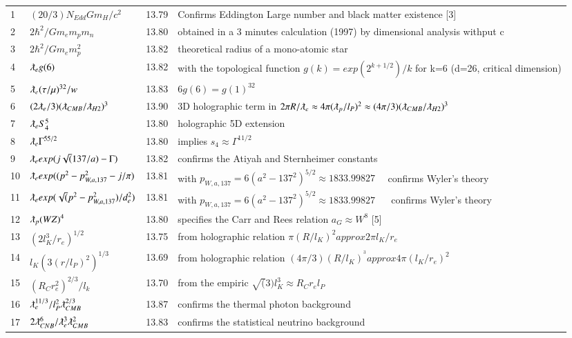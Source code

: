 \documentclass[a4paper,9pt]{article}
\begin{document}
\begin{appendix}
\begin{table}
\begin{tabular}{llll}
    
    1 & $(20/3)N_{Edd}Gm_H/c^2$ & 13.79 & Confirms Eddington Large number and black matter existence [3] \\
    2 & $2\hbar^2/Gm_em_pm_n$ & 13.80 & obtained in a 3 minutes calculation (1997) by dimensional analysis withput c\\
    3 & $2\hbar^2/Gm_em_p^2$ & 13.82 & theoretical radius of a mono-atomic star\\
    4 & $\lambdabar_{e} g(6)$ & 13.82 & with the topological function $g(k)=exp(2^{k+1/2})/k$ for k=6 (d=26, critical dimension)\\
    5 & $\lambdabar_{e} (\tau/\mu)^{32}/w$ & 13.83 & $6g(6) = g(1)^{32}$\\     
    6 & $(2\lambdabar_{e}/3)(\lambdabar_{CMB}/\lambdabar_{H2})^3$ & 13.90 & 3D holographic term in $2\pi R/\lambdabar_{e} \approx 4\pi (\lambdabar_{p}/l_P)^2 \approx (4\pi /3) (\lambdabar_{CMB}/\lambdabar_{H2})^3$ \\
    7 & $\lambdabar_{e} S_4^5$ & 13.80 & holographic 5D extension\\
    8 & $\lambdabar_{e} \Gamma^{55/2}$ & 13.80 & implies $s_4 \approx \Gamma^{11/2}$\\
    9 & $\lambdabar_{e} exp(j\sqrt (137/a) - \Gamma)$ & 13.82 &confirms the Atiyah and Sternheimer constants\\ 
    10 & $\lambdabar_{e} exp((p^2-p_{W,a,137}^2 - j/\pi)$ & 13.81 & with $p_{W,a,137} = 6(a^2 - 137^2)^{5/2} \approx 1833.99827$~~ confirms Wyler's theory\\ 
    11 & $\lambdabar_{e} exp(\sqrt (p^2-p_{W,a,137}^2)/d_e^2)$ & 13.81 & with $p_{W,a,137} = 6(a^2 - 137^2)^{5/2} \approx 1833.99827$ ~~ confirms Wyler's theory\\ 
    12 & $\lambdabar_{p} {(WZ)}^{4}$ & 13.80 & specifies the Carr and Rees relation $a_G \approx W^8$ [5] \\
    13 &  $(2l_K^3/r_e)^{1/2}$ & 13.75 & from holographic relation $\pi(R/l_K)^2 approx 2\pi l_K/r_e$  \\
    14 &  $l_K(3(r/l_P)^2)^{1/3}$ & 13.69 & from holographic relation $(4\pi/3) (R/l_K)^^3  approx 4\pi (l_K/r_e)^2$ \\
    15 &  $(R_{C}r_e^2)^{2/3}/l_k$ & 13.70 & from the empiric $\sqrt(3) l_K^3  \approx R_{C}r_el_P$ \\
    16 & $\lambdabar_{e} ^{11/3}/l_P^2 \lambdabar_{CMB}^{2/3}$ & 13.87 & confirms the thermal photon background\\
    17 & $2\lambdabar_{CNB}^6/\lambdabar_e ^3 \lambdabar_{CMB}^2$ & 13.83 & confirms the statistical neutrino background\\

\end{tabular}
\end{table}
\end{appendix}
\end{document}
